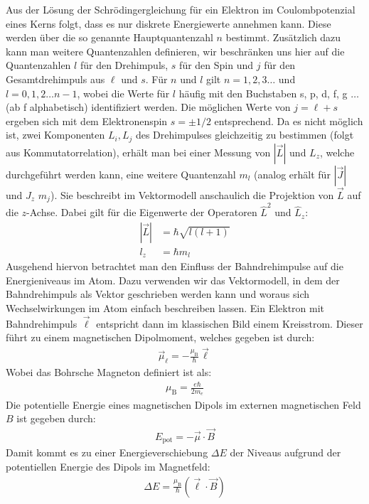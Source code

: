 \documentclass[11pt, a4paper]{article}
\begin{document}
Aus der Lösung der Schrödingergleichung für ein Elektron im Coulombpotenzial eines Kerns folgt, dass es nur diskrete Energiewerte annehmen kann.
Diese werden über die so genannte Hauptquantenzahl $n$ bestimmt.
Zusätzlich dazu kann man weitere Quantenzahlen definieren, wir beschränken uns hier auf die Quantenzahlen $l$ für den Drehimpuls, $s$ für den Spin und $j$ für den Gesamtdrehimpuls aus $\ell$ und $s$.
Für $n$ und $l$ gilt $n=1, 2, 3 \dots$ und $l=0, 1, 2 \dots n-1$, wobei die Werte für $l$ häufig mit den Buchstaben s, p, d, f, g $\dots$ (ab f alphabetisch) identifiziert werden.
Die möglichen Werte von $j=\ell+s$ ergeben sich mit dem Elektronenspin $s=\pm1/2$ entsprechend.
Da es nicht möglich ist, zwei Komponenten $L_i, L_j$ des Drehimpulses gleichzeitig zu bestimmen (folgt aus Kommutatorrelation), erhält man bei einer Messung von $|\vec{L}|$ und $L_z$, welche durchgeführt werden kann, eine weitere Quantenzahl $m_l$ (analog erhält für $|\vec{J}|$ und $J_z$ $m_j$). Sie beschreibt im Vektormodell anschaulich die Projektion von $\vec{L}$ auf die $z$-Achse.
Dabei gilt für die Eigenwerte der Operatoren $\hat{L}^2$ und $\hat{L}_z$:
\begin{align*}
|\vec{L}|&=\hbar\sqrt{l(l+1)}\\
l_z&=\hbar m_l
\end{align*}
Ausgehend hiervon betrachtet man den Einfluss der Bahndrehimpulse auf die Energieniveaus im Atom.
Dazu verwenden wir das Vektormodell, in dem der Bahndrehimpuls als Vektor geschrieben werden kann und woraus sich Wechselwirkungen im Atom einfach beschreiben lassen.
Ein Elektron mit Bahndrehimpuls $\vec{\ell}$ entspricht dann im klassischen Bild einem Kreisstrom.
Dieser führt zu einem magnetischen Dipolmoment, welches gegeben ist durch:
\begin{align*}
	\vec{\mu}_\ell = - \frac{\mu_\mathrm{B}}{\hbar} \vec{\ell}
\end{align*}
Wobei das Bohrsche Magneton definiert ist als:
\begin{align*}
	\mu_\mathrm{B} = \frac{e \hbar}{2 m_e}
\end{align*}
Die potentielle Energie eines magnetischen Dipols im externen magnetischen Feld $B$ ist gegeben durch:
\begin{align*}
	E_\mathrm{pot} = - \vec{\mu} \cdot \vec{B}
\end{align*}
Damit kommt es zu einer Energieverschiebung $\Delta E$ der Niveaus aufgrund der potentiellen Energie des Dipols im Magnetfeld:
\begin{align*}
	\Delta E = \frac{\mu_\mathrm{B}}{\hbar} \left( \vec{\ell} \cdot \vec{B} \right)
\end{align*}
\end{document}
